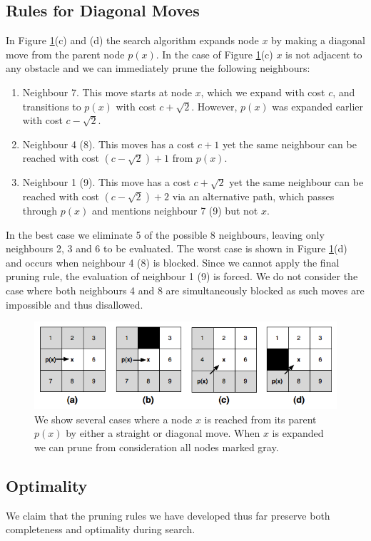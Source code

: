 \subsection{Rules for Diagonal Moves}
In Figure \ref{fig:pruningrules}(c) and (d) the search algorithm expands node
$x$ by making a diagonal move from the parent node $p(x)$.
In the case of Figure \ref{fig:pruningrules}(c) $x$ is not adjacent to any obstacle and 
we can immediately prune the following neighbours:
\begin{enumerate}
\item Neighbour 7. This move starts at node $x$, which we expand with cost $c$, and
transitions to $p(x)$ with cost $c + \sqrt2$. However, $p(x)$ was expanded earlier 
with cost $c - \sqrt2$.
\item Neighbour 4 (8). This moves has a cost $c + 1$ yet the same neighbour can be reached 
with cost $(c - \sqrt2) + 1$ from $p(x)$.
\item Neighbour 1 (9). This move has a cost $c + \sqrt2$ yet the same neighbour 
can be reached with cost $(c - \sqrt2) + 2$ via an alternative path, which passes 
through $p(x)$ and mentions neighbour 7 (9) but not $x$. 
\end{enumerate}
\noindent
In the best case we eliminate 5 of the possible 8 neighbours, leaving only
neighbours 2, 3 and 6 to be evaluated.
The worst case is shown in Figure \ref{fig:pruningrules}(d) and occurs when 
neighbour 4 (8) is blocked. Since we cannot apply the final pruning rule, 
the evaluation of neighbour 1 (9) is forced.
We do not consider the case where both neighbours 4 
and 8 are simultaneously blocked as such moves are impossible and thus
disallowed.

\begin{figure}[tb]
       \begin{center}
		   \includegraphics[scale=0.4, trim = 10mm 10mm 10mm 0mm]{diagrams/pruningrules.png}
       \end{center}
	\vspace{-3pt}
       \caption{We show several cases where a node $x$ is reached from its
parent $p(x)$ by either a straight or diagonal move. When $x$ is expanded we can prune from consideration all nodes marked gray.}
       \label{fig:pruningrules}
\end{figure}


\subsection{Optimality}

We claim that the pruning rules we have developed thus far preserve both
completeness and optimality during search. 



